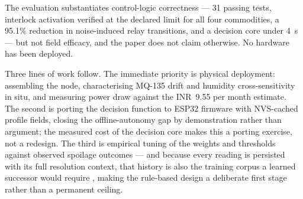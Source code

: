 \documentclass[conference]{IEEEtran}
\newcommand{\INR}{INR~}
\begin{document}
The evaluation substantiates control-logic correctness --- 31 passing
tests, interlock activation verified at the declared limit for all four
commodities, a 95.1\% reduction in noise-induced relay transitions, and a
decision core under 4~\textmu s --- but not field efficacy, and the paper
does not claim otherwise. No hardware has been deployed.

Three lines of work follow. The immediate priority is physical deployment:
assembling the node, characterising MQ-135 drift and humidity
cross-sensitivity in situ, and measuring power draw against the
\INR{}9.55 per month estimate. The second is porting the decision function
to ESP32 firmware with NVS-cached profile fields, closing the
offline-autonomy gap by demonstration rather than argument; the measured
cost of the decision core makes this a porting exercise, not a redesign.
The third is empirical tuning of the weights and thresholds against
observed spoilage outcomes --- and because every reading is persisted with
its full resolution context, that history is also the training corpus a
learned successor would require \cite{rashvand2025}, making the rule-based
design a deliberate first stage rather than a permanent ceiling.
\end{document}
